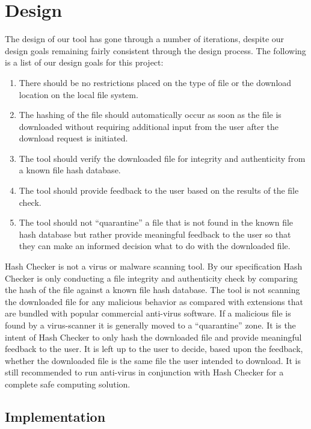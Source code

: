 \documentclass[letterpaper,twocolumn,10pt]{article}
\begin{document}
\section{Design}

The design of our tool has gone through a number of iterations, despite our design goals remaining fairly consistent through the design process. The following is a list of our design goals for this project:

\begin{enumerate}
\item There should be no restrictions placed on the type of file or the download location on the local file system.
\item The hashing of the file should automatically occur as soon as the file is downloaded without requiring additional input from the user after the download request is initiated.
\item The tool should verify the downloaded file for integrity and authenticity from a known file hash database.
\item The tool should provide feedback to the user based on the results of the file check.
\item The tool should not “quarantine” a file that is not found in the known file hash database but rather provide meaningful feedback to the user so that they can make an informed decision what to do with the downloaded file.
\end{enumerate}

Hash Checker is not a virus or malware scanning tool. By our specification Hash Checker is only conducting a file integrity and authenticity check by comparing the hash of the file against a known file hash database. The tool is not scanning the downloaded file for any malicious behavior as compared with extensions that are bundled with popular commercial anti-virus software. If a malicious file is found by a virus-scanner it is generally moved to a “quarantine” zone. It is the intent of Hash Checker to only hash the downloaded file and provide meaningful feedback to the user. It is left up to the user to decide, based upon the feedback, whether the downloaded file is the same file the user intended to download. It is still recommended to run anti-virus in conjunction with Hash Checker for a complete safe computing solution.

\subsection{Implementation}
\end{document}
